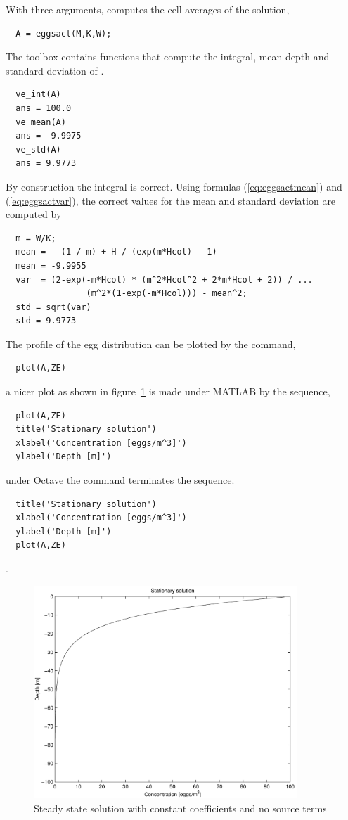 
With three arguments,  computes the cell averages of
the solution,
\begin{verbatim}
  A = eggsact(M,K,W);
\end{verbatim}
The toolbox contains functions that compute the integral, mean depth and
standard deviation of .
\begin{verbatim}
  ve_int(A)
  ans = 100.0 
  ve_mean(A) 
  ans = -9.9975
  ve_std(A) 
  ans = 9.9773 
\end{verbatim}
By construction the integral is correct. Using formulas
(\ref{eq:eggsactmean}) and (\ref{eq:eggsactvar}), the
correct values for the mean and standard deviation are computed by
\begin{verbatim}
  m = W/K; 
  mean = - (1 / m) + H / (exp(m*Hcol) - 1) 
  mean = -9.9955 
  var  = (2-exp(-m*Hcol) * (m^2*Hcol^2 + 2*m*Hcol + 2)) / ... 
                (m^2*(1-exp(-m*Hcol))) - mean^2;
  std = sqrt(var) 
  std = 9.9773
\end{verbatim}


The profile of the egg distribution  can be plotted by the command,
\begin{verbatim}
  plot(A,ZE)
\end{verbatim}
a nicer plot as shown in figure~\ref{fig:ex1a} is made under MATLAB by
the sequence,
\begin{verbatim}
  plot(A,ZE)
  title('Stationary solution')
  xlabel('Concentration [eggs/m^3]')
  ylabel('Depth [m]') 
\end{verbatim}
under Octave the  command terminates the sequence.
\begin{verbatim}
  title('Stationary solution') 
  xlabel('Concentration [eggs/m^3]') 
  ylabel('Depth [m]') 
  plot(A,ZE)
\end{verbatim}.

\begin{figure}
\begin{center}
\includegraphics[height=8cm]{ex1a}
\end{center}
\caption{Steady state solution with constant coefficients and no 
         source terms}\label{fig:ex1a}
\end{figure}

